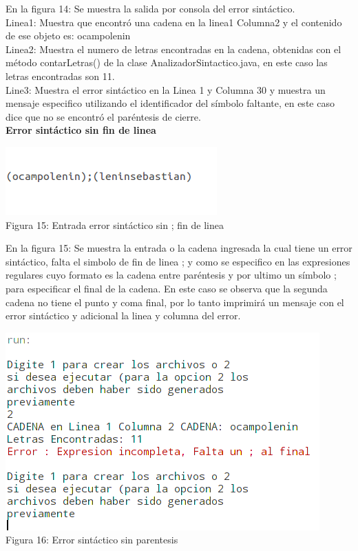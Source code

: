 \documentclass[a4paper,openright,12pt]{article}
\begin{document}
En la figura 14: Se muestra la salida por consola del error sintáctico.\\

Linea1: Muestra que encontró una cadena en la linea1 Columna2 y el contenido de ese objeto es: ocampolenin\\

Linea2:  Muestra el numero de letras encontradas en la cadena, obtenidas con el método contarLetras() de la clase AnalizadorSintactico.java, en este caso las letras encontradas son 11.\\

Line3: Muestra el error sintáctico en la Linea 1 y Columna 30 y muestra un mensaje especifico utilizando el identificador del símbolo faltante, en este caso dice que no se encontró el paréntesis de cierre.
\\

\textbf{Error sintáctico sin fin de linea}

\begin{center}
\includegraphics[height=0.11\textheight]{error2entrada.png}
\\
Figura 15: Entrada error sintáctico sin ; fin de linea
\end{center}

En la figura 15: Se muestra la entrada o la cadena ingresada la cual tiene un error sintáctico, falta el simbolo de fin de linea ; y como se especifico en las expresiones regulares cuyo formato es la cadena entre paréntesis y por ultimo un símbolo ; para especificar el final de la cadena. En este caso se observa que la segunda cadena no tiene  el punto y coma final, por lo tanto imprimirá un mensaje con el error sintáctico y adicional la linea y columna del error. 

\begin{center}
\includegraphics[height=0.3\textheight]{error2.png}
\\
Figura 16: Error sintáctico sin parentesis
\end{center}
\end{document}
